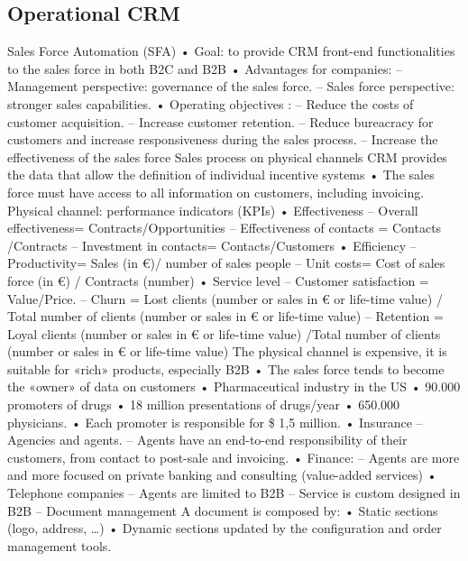 \subsection{Operational CRM}
Sales Force Automation (SFA)
• Goal: to provide CRM front-end functionalities to the sales force in both B2C and B2B
• Advantages for companies:
– Management perspective: governance of the sales force.
– Sales force perspective: stronger sales capabilities.
• Operating objectives :
– Reduce the costs of customer acquisition.
– Increase customer retention.
– Reduce bureacracy for customers and increase responsiveness during the sales process.
– Increase the effectiveness of the sales force
Sales process on physical channels
CRM provides the data that allow the definition of individual incentive
systems
• The sales force must have access to all information on customers,
including invoicing.
Physical channel: performance indicators (KPIs)
• Effectiveness
– Overall effectiveness= Contracts/Opportunities
– Effectiveness of contacts = Contacts /Contracts
– Investment in contacts= Contacts/Customers
• Efficiency
– Productivity= Sales (in €)/ number of sales people
– Unit costs= Cost of sales force (in €) / Contracts (number)
• Service level
– Customer satisfaction = Value/Price.
– Churn = Lost clients (number or sales in € or life-time value) / Total number of clients (number or
sales in € or life-time value)
– Retention = Loyal clients (number or sales in € or life-time value) /Total number of clients
(number or sales in € or life-time value)
The physical channel is expensive, it is suitable for «rich» products, especially B2B
• The sales force tends to become the «owner» of data on customers
• Pharmaceutical industry in the US
• 90.000 promoters of drugs
• 18 million presentations of drugs/year
• 650.000 physicians.
• Each promoter is responsible for \$ 1,5 million.
• Insurance
– Agencies and agents.
– Agents have an end-to-end responsibility of their customers, from contact to post-sale and invoicing.
• Finance:
– Agents are more and more focused on private banking and consulting (value-added services)
• Telephone companies
– Agents are limited to B2B
– Service is custom designed in B2B
– Document management
A document is composed by:
• Static sections (logo, address, …)
• Dynamic sections updated by the
configuration and order management tools.

